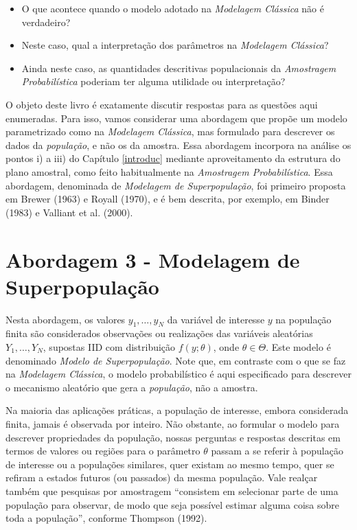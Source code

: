 \documentclass[
  12pt,
  brazilian,
]{book}
\theoremstyle{definition}
\theoremstyle{definition}
\theoremstyle{definition}
\theoremstyle{definition}
\theoremstyle{remark}
\begin{document}
\begin{itemize}
\item
  O que acontece quando o modelo adotado na \emph{Modelagem Clássica} não é verdadeiro?
\item
  Neste caso, qual a interpretação dos parâmetros na \emph{Modelagem Clássica}?
\item
  Ainda neste caso, as quantidades descritivas populacionais da \emph{Amostragem Probabilística} poderiam ter alguma utilidade ou interpretação?
\end{itemize}

O objeto deste livro é exatamente discutir respostas para as questões aqui
enumeradas. Para isso, vamos considerar uma abordagem que propõe um modelo
parametrizado como na \emph{Modelagem Clássica}, mas formulado para descrever os
dados da \emph{população}, e não os da amostra. Essa abordagem incorpora na análise os pontos i) a iii) do Capítulo \ref{introduc} mediante aproveitamento da estrutura do plano amostral, como feito habitualmente na \emph{Amostragem Probabilística}. Essa abordagem, denominada de \emph{Modelagem de Superpopulação}, foi primeiro proposta em Brewer (1963) e Royall (1970), e é bem descrita, por exemplo, em Binder (1983) e Valliant et al. (2000).

\hypertarget{modelsuperpop}{%
\section{Abordagem 3 - Modelagem de Superpopulação}\label{modelsuperpop}}

Nesta abordagem, os valores \(y_{1}, \ldots , y_{N}\) da variável de interesse
\(y\) na população finita são considerados observações ou realizações das variáveis
aleatórias \(Y_{1}, \ldots , Y_{N}\), supostas IID com distribuição \(f(y;\theta)\),
onde \(\theta \in \Theta\). Este modelo é denominado \emph{Modelo de Superpopulação}. Note que, em contraste com o que se faz na \emph{Modelagem Clássica}, o modelo probabilístico é aqui especificado para descrever o mecanismo aleatório que gera
a \emph{população}, não a amostra.

Na maioria das aplicações práticas, a população de interesse, embora considerada finita, jamais é observada por inteiro. Não obstante, ao formular o modelo para descrever propriedades da população, nossas perguntas e respostas descritas em termos de valores ou regiões para o parâmetro \(\theta\) passam a se referir à população de interesse ou a populações similares, quer existam ao mesmo tempo, quer se refiram a estados futuros (ou passados) da mesma população. Vale realçar também que pesquisas por amostragem ``consistem em selecionar parte de uma população para observar, de modo que seja possível estimar alguma coisa sobre toda a população'', conforme Thompson (1992).
\end{document}
